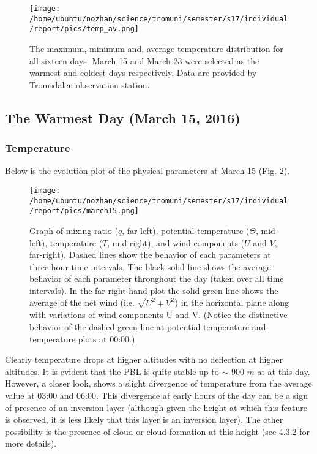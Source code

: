 \documentclass[a4paper,12pt]{article}
\numberwithin{equation}{section} %
\begin{document}
\vspace{2.5 cm}

\begin{figure}[bhp]
	\texttt{[image: /home/ubuntu/nozhan/science/tromuni/semester/s17/individual/report/pics/temp\_av.png]}
	\caption{The maximum, minimum and, average temperature distribution for all sixteen days. March 15 and March 23 were selected as the warmest and coldest days respectively. Data are provided by Tromsdalen observation station.}
	\label{warmcold}
\end{figure}


\subsection{The Warmest Day (March 15, 2016)}

\subsubsection{Temperature}

Below is the evolution plot of the physical parameters at March 15 (Fig. \ref{march15}).

\begin{figure}[bhp]
\texttt{[image: /home/ubuntu/nozhan/science/tromuni/semester/s17/individual/report/pics/march15.png]}
\caption{Graph of mixing ratio ($q$, far-left), potential temperature ($\Theta$, mid-left), temperature ($T$, mid-right), and wind components ($U$ and $V$, far-right). Dashed lines show the behavior of each parameters at three-hour time intervals. The black solid line shows the average behavior of each parameter throughout the day (taken over all time intervals). In the far right-hand plot the solid green line shows the average of the net wind (i.e. $\sqrt{U^2 + V^2}$) in the horizontal plane along with variations of wind components U and V. (Notice the distinctive behavior of the dashed-green line at potential temperature and temperature plots at 00:00.)}
\label{march15}
\end{figure}

\vspace{1cm}

Clearly temperature drops at higher altitudes with no deflection at higher altitudes. It is evident that the PBL is quite stable up to $\sim$ 900 $m$ at at this day. However, a closer look, shows a slight divergence of temperature from the average value at 03:00 and 06:00. This divergence at early hours of the day can be a sign of presence of an inversion layer (although given the height at which this feature is observed, it is less likely that this layer is an inversion layer). The other possibility is the presence of cloud or cloud formation at this height (see 4.3.2 for more details). 
\end{document}
